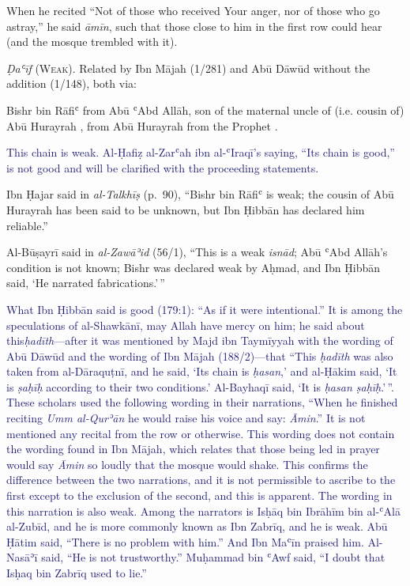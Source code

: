 \begin{mdframed}[style=narration, frametitle={Narration \#952}]
When he recited “Not of those who received Your anger, nor of those who go astray,” he said \textit{āmīn}, such that those close to him in the first row could hear (and the mosque trembled with it).
\end{mdframed}

\emph{Ḍaʿīf} (\textsc{Weak}). Related by Ibn Mājah (1/281) and Abū Dāwūd
without the addition (1/148), both via:

Bishr bin Rāfiʿ from Abū ʿAbd Allāh, son of the maternal uncle of (i.e. cousin of) Abū Hurayrah \mabpwhim,
from Abū Hurayrah \mabpwhim from the Prophet \pbuh.

\textcolor{MidnightBlue}{This chain is weak. Al-Ḥafiẓ
al-Zarʿah ibn al-ʿIraqī's saying, ``Its chain is good,'' is not good and will be clarified with the proceeding statements.}

Ibn Ḥajar said in \emph{al-Talkhīṣ} (p.~90), ``Bishr bin Rāfiʿ is weak;
the cousin of Abū Hurayrah \mabpwhim has been said to be unknown, but
Ibn Ḥibbān has declared him reliable.''

Al-Būṣayrī said in \emph{al-Zawāʾid} (56/1), ``This is a weak
\emph{isnād}; Abū ʿAbd Allāh's condition is not known; Bishr was
declared weak by Aḥmad, and Ibn Ḥibbān said, `He narrated
fabrications.'\,''

\textcolor{MidnightBlue}{What Ibn Ḥibbān said
is good (179:1): ``As if it were intentional.'' It is among the
speculations of al-Shawkānī, may Allah have mercy on him; he said about
this\emph{ḥadīth}---after it was mentioned by Majd ibn Taymīyyah with the
wording of Abū Dāwūd and the wording of Ibn Mājah (188/2)---that ``This \emph{ḥadīth} was also taken from al-Dāraquṭnī, and he
said, `Its chain is \emph{ḥasan},' and al-Ḥākim said, `It is
\emph{ṣaḥīḥ} according to their two conditions.' Al-Bayhaqī said, `It is
\emph{ḥasan ṣaḥīḥ}.'\,''. These scholars used the following wording in
their narrations, ``When he \pbuh finished reciting \emph{Umm al-Qurʾān}
he would raise his voice and say: \emph{Āmin}.'' It is not mentioned any
recital from the row or otherwise. This wording does not contain the
wording found in Ibn Mājah, which relates that those being led in prayer
would say \emph{Āmin} so loudly that the mosque would shake. This
confirms the difference between the two narrations, and it is not
permissible to ascribe to the first except to the exclusion of the
second, and this is apparent. The wording in this narration is also
weak. Among the narrators is Isḥāq bin Ibrāhīm bin al-ʿAlā al-Zubīd, and
he is more commonly known as Ibn Zabrīq, and he is weak. Abū Ḥātim said,
``There is no problem with him.'' And Ibn Maʿīn praised him. Al-Nasāʾī
said, ``He is not trustworthy.'' Muḥammad bin ʿAwf said, ``I doubt that
Isḥaq bin Zabrīq used to lie.''}


